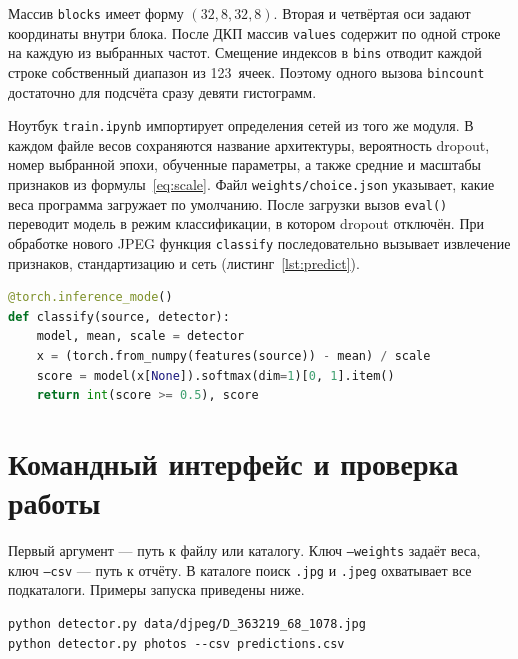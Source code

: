 Массив \texttt{blocks} имеет форму $(32,8,32,8)$. Вторая и четвёртая оси задают координаты внутри блока. После ДКП массив \texttt{values} содержит по одной строке на каждую из выбранных частот. Смещение индексов в \texttt{bins} отводит каждой строке собственный диапазон из 123~ячеек. Поэтому одного вызова \texttt{bincount} достаточно для подсчёта сразу девяти гистограмм.

Ноутбук \texttt{train.ipynb} импортирует определения сетей из того же модуля. В каждом файле весов сохраняются название архитектуры, вероятность dropout, номер выбранной эпохи, обученные параметры, а также средние и масштабы признаков из формулы~\eqref{eq:scale}. Файл \texttt{weights/choice.json} указывает, какие веса программа загружает по умолчанию. После загрузки вызов \texttt{eval()} переводит модель в режим классификации, в котором dropout отключён. При обработке нового JPEG функция \texttt{classify} последовательно вызывает извлечение признаков, стандартизацию и сеть (листинг~\ref{lst:predict}).

\noindent\begin{minipage}{\linewidth}
\begin{lstlisting}[language=Python,
 caption={Получение класса и оценки двукратного сжатия},
 label={lst:predict}]
@torch.inference_mode()
def classify(source, detector):
    model, mean, scale = detector
    x = (torch.from_numpy(features(source)) - mean) / scale
    score = model(x[None]).softmax(dim=1)[0, 1].item()
    return int(score >= 0.5), score
\end{lstlisting}
\end{minipage}

\section{Командный интерфейс и проверка работы}

Первый аргумент --- путь к файлу или каталогу. Ключ \texttt{--weights} задаёт веса, ключ \texttt{--csv} --- путь к отчёту. В каталоге поиск \texttt{.jpg} и \texttt{.jpeg} охватывает все подкаталоги. Примеры запуска приведены ниже.

\noindent\begin{minipage}{\linewidth}
\begin{lstlisting}[frame=none]
python detector.py data/djpeg/D_363219_68_1078.jpg
python detector.py photos --csv predictions.csv
\end{lstlisting}
\end{minipage}

